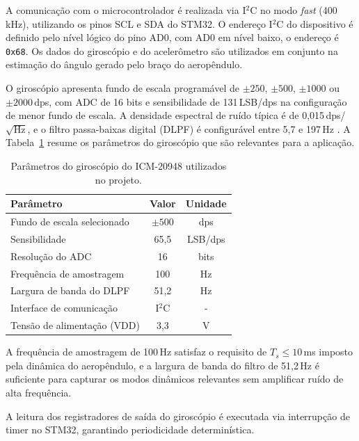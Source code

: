 A comunicação com o microcontrolador é realizada via I$^2$C no modo \textit{fast} (400\,kHz), utilizando os pinos SCL e SDA do STM32. O endereço I$^2$C do dispositivo é definido pelo nível lógico do pino AD0, com AD0 em nível baixo, o endereço é \texttt{0x68}. Os dados do giroscópio e do acelerômetro são utilizados em conjunto na estimação do ângulo gerado pelo braço do aeropêndulo.

O giroscópio apresenta fundo de escala programável de $\pm250$, $\pm500$, $\pm1000$ ou $\pm2000$\,dps, com ADC de 16 bits e sensibilidade de 131\,LSB/dps na configuração de menor fundo de escala. A densidade espectral de ruído típica é de 0,015\,dps/$\sqrt{\text{Hz}}$, e o filtro passa-baixas digital (DLPF) é configurável entre 5,7 e 197\,Hz \cite{invensense2021icm20948}. A Tabela~\ref{tab:icm_gyro} resume os parâmetros do giroscópio que são relevantes para a aplicação.

\begin{table}[H]
    \centering
    \caption{Parâmetros do giroscópio do ICM-20948 utilizados no projeto.}
    \label{tab:icm_gyro}
    \begin{tabular}{lcc}
        \toprule
        \textbf{Parâmetro} & \textbf{Valor} & \textbf{Unidade} \\
        \midrule
        Fundo de escala selecionado & $\pm500$ & dps \\
        Sensibilidade                & 65,5   & LSB/dps \\
        Resolução do ADC             & 16     & bits \\
        Frequência de amostragem     & 100    & Hz \\
        Largura de banda do DLPF     & 51,2   & Hz \\
        Interface de comunicação     & I$^2$C & {-} \\
        Tensão de alimentação (VDD)  & 3,3    & V \\
        \bottomrule
    \end{tabular}
\end{table}

A frequência de amostragem de 100\,Hz satisfaz o requisito de $T_s \leq 10$\,ms imposto pela dinâmica do aeropêndulo, e a largura de banda do filtro de 51,2\,Hz é suficiente para capturar os modos dinâmicos relevantes sem amplificar ruído de alta frequência.

A leitura dos registradores de saída do giroscópio é executada via interrupção de timer no STM32, garantindo periodicidade determinística.

